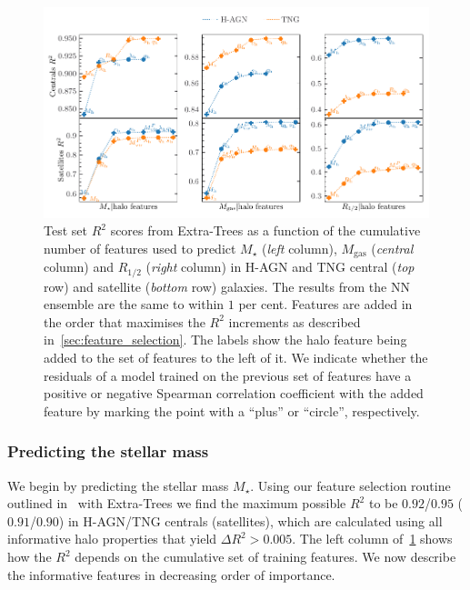 \documentclass[usenatbib,useAMS]{mnras}
\begin{document}
\begin{figure}
    \centering
    \includegraphics[width=\textwidth]{Figures/galaxyR2s.pdf}
    \caption{
    Test set $R^2$ scores from Extra-Trees as a function of the cumulative number of features used to predict $M_\star$ (\emph{left} column),  $M_\mathrm{gas}$ (\emph{central} column) and $R_{1/2}$ (\emph{right} column) in H-AGN and TNG central (\emph{top} row) and satellite (\emph{bottom} row) galaxies. The results from the NN ensemble are the same to within $1$ per cent. Features are added in the order that maximises the $R^2$ increments as described in~\cref{sec:feature_selection}. The labels show the halo feature being added to the set of features to the left of it. We indicate whether the residuals of a model trained on the previous set of features have a positive or negative Spearman correlation coefficient with the added feature by marking the point with a ``plus'' or ``circle'', respectively.}
    \label{fig:halo2gal_R2}
\end{figure}

\subsubsection{Predicting the stellar mass}\label{sec:mstar_pred}

We begin by predicting the stellar mass $M_\star$. Using our feature selection routine outlined in~ with Extra-Trees we find the maximum possible
$R^2$ to be $0.92$/$0.95$ ($0.91$/$0.90$) in H-AGN/TNG centrals (satellites), which are calculated using all informative halo properties that yield $\Delta R^2 > 0.005$. The left column of~\cref{fig:halo2gal_R2} shows how the $R^2$ depends on the cumulative set of training features. We now describe the informative features in decreasing order of importance.
\end{document}
